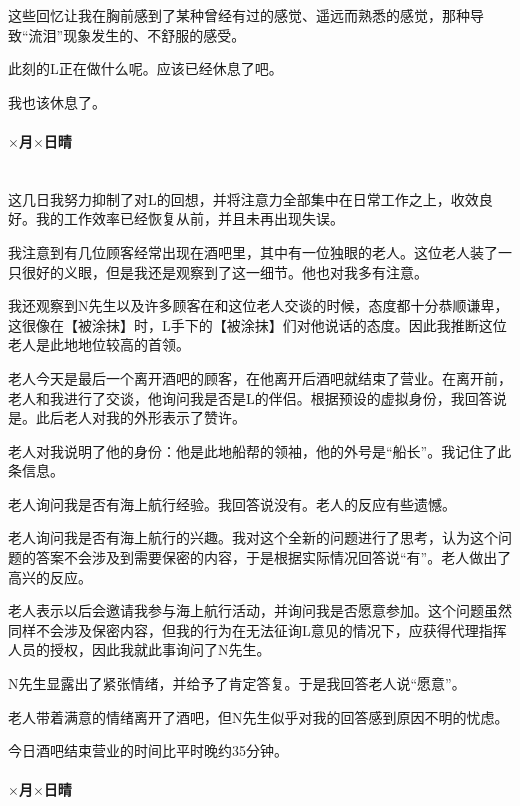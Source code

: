 这些回忆让我在胸前感到了某种曾经有过的感觉、遥远而熟悉的感觉，那种导致“流泪”现象发生的、不舒服的感受。

此刻的L正在做什么呢。应该已经休息了吧。

我也该休息了。

\par

\paragraph*{$\times$月$\times$日\quad 晴}\mbox{}\\

这几日我努力抑制了对L的回想，并将注意力全部集中在日常工作之上，收效良好。我的工作效率已经恢复从前，并且未再出现失误。

我注意到有几位顾客经常出现在酒吧里，其中有一位独眼的老人。这位老人装了一只很好的义眼，但是我还是观察到了这一细节。他也对我多有注意。

我还观察到N先生以及许多顾客在和这位老人交谈的时候，态度都十分恭顺谦卑，这很像在【被涂抹】时，L手下的【被涂抹】们对他说话的态度。因此我推断这位老人是此地地位较高的首领。

老人今天是最后一个离开酒吧的顾客，在他离开后酒吧就结束了营业。在离开前，老人和我进行了交谈，他询问我是否是L的伴侣。根据预设的虚拟身份，我回答说是。此后老人对我的外形表示了赞许。

老人对我说明了他的身份：他是此地船帮的领袖，他的外号是“船长”。我记住了此条信息。

老人询问我是否有海上航行经验。我回答说没有。老人的反应有些遗憾。

老人询问我是否有海上航行的兴趣。我对这个全新的问题进行了思考，认为这个问题的答案不会涉及到需要保密的内容，于是根据实际情况回答说“有”。老人做出了高兴的反应。

老人表示以后会邀请我参与海上航行活动，并询问我是否愿意参加。这个问题虽然同样不会涉及保密内容，但我的行为在无法征询L意见的情况下，应获得代理指挥人员的授权，因此我就此事询问了N先生。

N先生显露出了紧张情绪，并给予了肯定答复。于是我回答老人说“愿意”。

老人带着满意的情绪离开了酒吧，但N先生似乎对我的回答感到原因不明的忧虑。

今日酒吧结束营业的时间比平时晚约35分钟。

\par

\paragraph*{$\times$月$\times$日\quad 晴}\mbox{}\\

